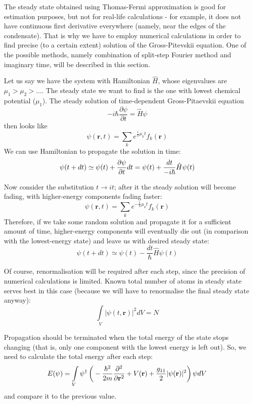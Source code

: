 \documentclass[12pt,notitlepage]{report}
\author{Bogdan Opanchuk}
\begin{document}
The steady state obtained using Thomas-Fermi approximation is good for estimation purposes, but not for
real-life calculations - for example, it does not have continuous first derivative everywhere (namely,
near the edges of the condensate). That is why we have to employ numerical calculations in order
to find precise (to a certain extent) solution of the Gross-Pitevskii equation. One of the possible methods, 
namely combination of split-step Fourier method and imaginary time, will be described in this section.

Let us say we have the system with Hamiltonian $\hat{H}$, whose eigenvalues are $\mu_1 > \mu_2 > ...$.
The steady state we want to find is the one with lowest chemical potential ($\mu_1$). The steady
solution of time-dependent Gross-Pitaevskii equation
\[ -i \hbar \frac{\partial \psi}{\partial t} = \hat{H} \psi \]
then looks like
\[ \psi(\mathbf{r}, t) = \sum_k e^{\frac{i}{h} \mu_k t} f_k(\mathbf{r}) \]
We can use Hamiltonian to propagate the solution in time:
\[ 
\psi(t + dt) \simeq \psi(t) + \frac{\partial \psi}{\partial t} dt = \\
\psi(t) + \frac{dt}{-i \hbar} \hat{H} \psi(t)
\]

Now consider the substitution $t \rightarrow it$; after it the steady solution will become fading, with
higher-energy components fading faster:
\[ \psi(\mathbf{r}, t) = \sum_k e^{- \frac{1}{h} \mu_k t} f_k(\mathbf{r}) \]
Therefore, if we take some random solution and propagate it for a sufficient amount of time, higher-energy
components will eventually die out (in comparison with the lowest-energy state) and leave us with desired 
steady state:
\[ \psi(t + dt) \simeq \psi(t) - \frac{dt}{\hbar} \hat{H} \psi(t)\]

Of course, renormalisation will be required after each step, since the precision of numerical calculations is limited.
Known total number of atoms in steady state serves best in this case (because we will have to renormalise the
final steady state anyway):
\[ \int\limits_V \vert \psi(t, \mathbf{r}) \vert^2 dV = N \]

Propagation should be terminated when the total energy of the state stops changing (that is, only one component
with the lowest energy is left out). So, we need to calculate the total energy after each step:
\[ E(\psi) = \int\limits_V \psi^\dagger \left( \\
-\frac{\hbar^2}{2m} \frac{\partial^2}{\partial \mathbf{r}^2} + V(\mathbf{r}) + \\
\frac{g_{11}}{2} \vert \psi(\mathbf{r}) \vert^2 \right) \psi dV \]
and compare it to the previous value.
\end{document}
